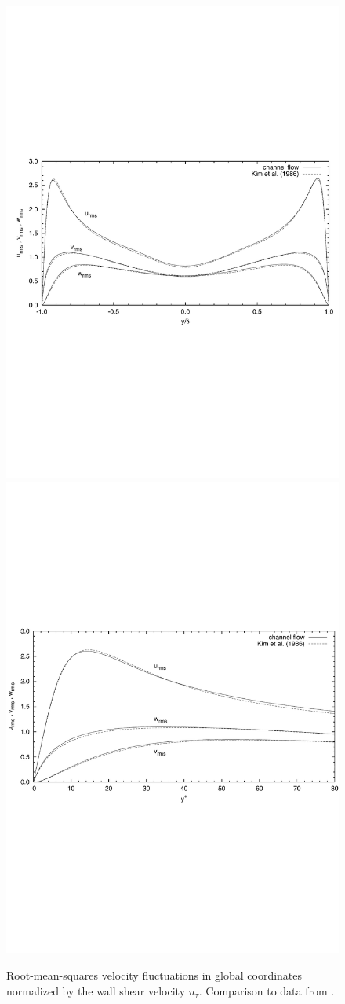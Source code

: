 \documentclass[11pt]{report}
\begin{document}
\begin{figure}
\begin{center}
\includegraphics[width=0.7\linewidth]{dns_rms_global}\\
\includegraphics[width=0.67\linewidth]{dns_rms_wall}
\end{center}
\caption{ Root-mean-squares velocity fluctuations in global
  coordinates normalized by the wall shear velocity
  $u_{\tau}$. Comparison to data from \citet{kmm87}.}
\label{pic:rms_global}
\end{figure}


\clearpage
{}



\end{document}
